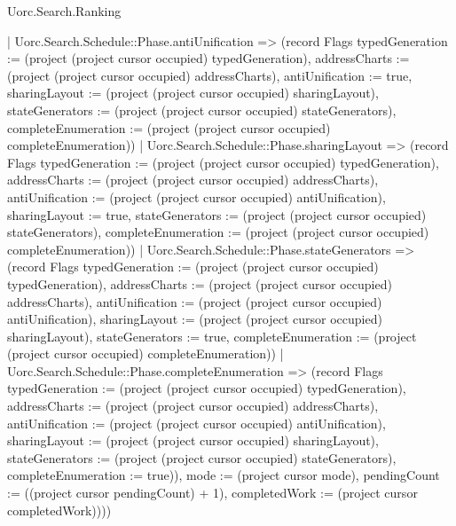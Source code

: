 \begin{lexlean}{Uorc.Search.Ranking}
\begin{semanticmodule}
{{    | Uorc.Search.Schedule::Phase.antiUnification => (record Flags {typedGeneration := (project (project cursor occupied) typedGeneration), addressCharts := (project (project cursor occupied) addressCharts), antiUnification := true, sharingLayout := (project (project cursor occupied) sharingLayout), stateGenerators := (project (project cursor occupied) stateGenerators), completeEnumeration := (project (project cursor occupied) completeEnumeration)})
    | Uorc.Search.Schedule::Phase.sharingLayout => (record Flags {typedGeneration := (project (project cursor occupied) typedGeneration), addressCharts := (project (project cursor occupied) addressCharts), antiUnification := (project (project cursor occupied) antiUnification), sharingLayout := true, stateGenerators := (project (project cursor occupied) stateGenerators), completeEnumeration := (project (project cursor occupied) completeEnumeration)})
    | Uorc.Search.Schedule::Phase.stateGenerators => (record Flags {typedGeneration := (project (project cursor occupied) typedGeneration), addressCharts := (project (project cursor occupied) addressCharts), antiUnification := (project (project cursor occupied) antiUnification), sharingLayout := (project (project cursor occupied) sharingLayout), stateGenerators := true, completeEnumeration := (project (project cursor occupied) completeEnumeration)})
    | Uorc.Search.Schedule::Phase.completeEnumeration => (record Flags {typedGeneration := (project (project cursor occupied) typedGeneration), addressCharts := (project (project cursor occupied) addressCharts), antiUnification := (project (project cursor occupied) antiUnification), sharingLayout := (project (project cursor occupied) sharingLayout), stateGenerators := (project (project cursor occupied) stateGenerators), completeEnumeration := true})), mode := (project cursor mode), pendingCount := ((project cursor pendingCount) + 1), completedWork := (project cursor completedWork)})))
}


\end{semanticmodule}
\end{lexlean}

